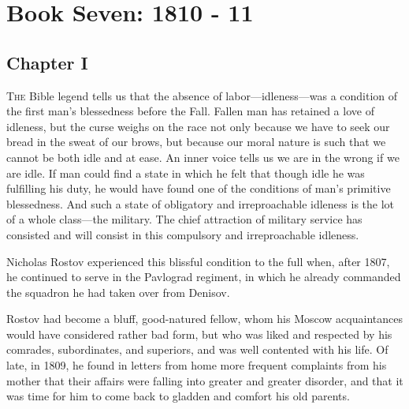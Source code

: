 \part*{Book Seven: 1810 - 11}


\chapter*{Chapter I}
\ifaudio
{} 
\fi

\lettrine[lines=2, loversize=0.3, lraise=0]{\initfamily T}{he}
Bible legend tells us that the absence of
labor---idleness---was a condition of the first man's blessedness
before the Fall. Fallen man has retained a love of idleness, but
the curse weighs on the race not only because we have to seek our
bread in the sweat of our brows, but because our moral nature is
such that we cannot be both idle and at ease. An inner voice
tells us we are in the wrong if we are idle. If man could find a
state in which he felt that though idle he was fulfilling his
duty, he would have found one of the conditions of man's
primitive blessedness. And such a state of obligatory and
irreproachable idleness is the lot of a whole class---the
military. The chief attraction of military service has consisted
and will consist in this compulsory and irreproachable idleness.

Nicholas Rostov experienced this blissful condition to the full
when, after 1807, he continued to serve in the Pavlograd
regiment, in which he already commanded the squadron he had taken
over from Denisov.

Rostov had become a bluff, good-natured fellow, whom his Moscow
acquaintances would have considered rather bad form, but who was
liked and respected by his comrades, subordinates, and superiors,
and was well contented with his life. Of late, in 1809, he found
in letters from home more frequent complaints from his mother
that their affairs were falling into greater and greater
disorder, and that it was time for him to come back to gladden
and comfort his old parents.

